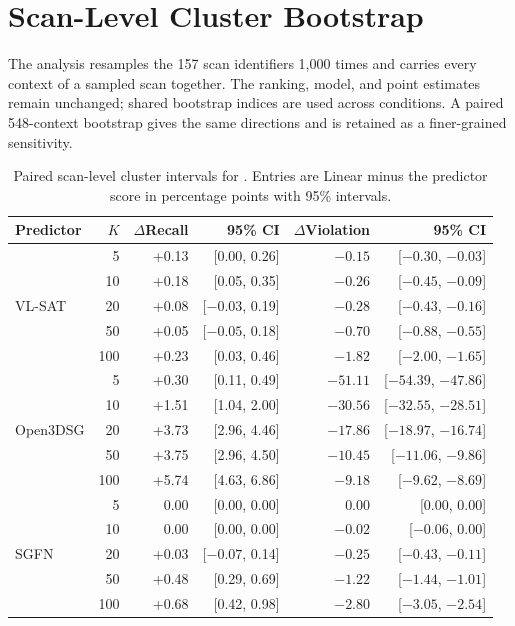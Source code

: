 \section{Scan-Level Cluster Bootstrap}

The analysis resamples the 157 scan identifiers 1,000 times and carries
every context of a sampled scan together. The ranking, model, and point
estimates remain unchanged; shared bootstrap indices are used across
conditions. A paired 548-context bootstrap gives the same directions and is
retained as a finer-grained sensitivity.

\begin{table}[t]
\centering
{\small
\setlength{\tabcolsep}{5pt}
\begin{tabular}{lrrrrr}
\toprule
Predictor & $K$ & $\Delta$Recall & 95\% CI & $\Delta$Violation & 95\% CI \\
\midrule
\multirow{5}{*}{VL-SAT}
 & 5   & +0.13 & [0.00, 0.26] & $-0.15$ & [$-0.30$, $-0.03$] \\
 & 10  & +0.18 & [0.05, 0.35] & $-0.26$ & [$-0.45$, $-0.09$] \\
 & 20  & +0.08 & [$-0.03$, 0.19] & $-0.28$ & [$-0.43$, $-0.16$] \\
 & 50  & +0.05 & [$-0.05$, 0.18] & $-0.70$ & [$-0.88$, $-0.55$] \\
 & 100 & +0.23 & [0.03, 0.46] & $-1.82$ & [$-2.00$, $-1.65$] \\
\midrule
\multirow{5}{*}{Open3DSG}
 & 5   & +0.30 & [0.11, 0.49] & $-51.11$ & [$-54.39$, $-47.86$] \\
 & 10  & +1.51 & [1.04, 2.00] & $-30.56$ & [$-32.55$, $-28.51$] \\
 & 20  & +3.73 & [2.96, 4.46] & $-17.86$ & [$-18.97$, $-16.74$] \\
 & 50  & +3.75 & [2.96, 4.50] & $-10.45$ & [$-11.06$, $-9.86$] \\
 & 100 & +5.74 & [4.63, 6.86] & $-9.18$ & [$-9.62$, $-8.69$] \\
\midrule
\multirow{5}{*}{SGFN}
 & 5   & 0.00 & [0.00, 0.00] & 0.00 & [0.00, 0.00] \\
 & 10  & 0.00 & [0.00, 0.00] & $-0.02$ & [$-0.06$, 0.00] \\
 & 20  & +0.03 & [$-0.07$, 0.14] & $-0.25$ & [$-0.43$, $-0.11$] \\
 & 50  & +0.48 & [0.29, 0.69] & $-1.22$ & [$-1.44$, $-1.01$] \\
 & 100 & +0.68 & [0.42, 0.98] & $-2.80$ & [$-3.05$, $-2.54$] \\
\bottomrule
\end{tabular}
}
\caption{Paired scan-level cluster intervals for \methodlinear{}. Entries are Linear minus the
predictor score in percentage points with 95\% intervals.}
\label{tab:scan-cluster}
\end{table}

